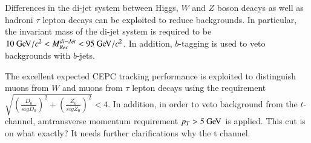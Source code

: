 \documentclass[11pt,a4paper]{cepcnote}
\begin{document}
Differences in the di-jet system between Higgs, $W$ and $Z$ boson deacys
as well as hadroni $\tau$ lepton decays can be exploited to reduce backgrounds.
In particular, the invariant mass of the di-jet system is required to be
$10\gev/c^2 < M_{Rec}^{di-Jet} < 95\gev/c^2 $. In addition, $b$-tagging is used
to veto backgrounds with $b$-jets.

The excellent expected CEPC tracking performance is exploited to
distinguish muons from $W$  and muons from $\tau$ lepton decays
using the requirement 
$\sqrt{(\frac{D_{0}}{sigD_{0}})^2+(\frac{Z_{0}}{sigZ_{0}})^2} < 4$.
In addition, in order to veto background from the $t$-channel, 
amtransverse momentum requirement $p_T > 5\gev$ is applied.
{\color{red} This cut is on what exactly? It needs further clarifications why
the t channel.}

\begin{figure}[H]
\centering
\end{figure}
\end{document}
